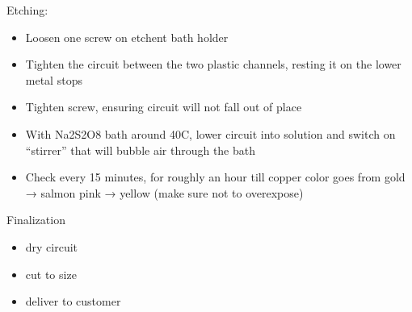 \documentclass{training}
\begin{document}
Etching:
\begin{itemize}
  \item Loosen one screw on etchent bath holder
  \item Tighten the circuit between the two plastic channels, resting it on the lower metal stops
  \item Tighten screw, ensuring circuit will not fall out of place
  \item With Na2S2O8 bath around 40C, lower circuit into solution and switch on “stirrer” that will bubble air through the bath
  \item Check every 15 minutes, for roughly an hour till copper color goes from gold → salmon pink → yellow (make sure not to overexpose)
\end{itemize}

Finalization
\begin{itemize}
  \item dry circuit
  \item cut to size
  \item deliver to customer
\end{itemize}
\end{document}
